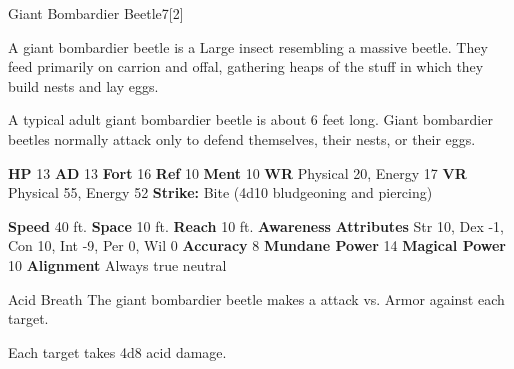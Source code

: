  
  \begin{monsection}{Giant Bombardier Beetle}{7}[2]
    \vspace{-1em}\vspace{-1em}
    \vspace{0em}

    
        A giant bombardier beetle is a Large insect resembling a massive beetle.
        They feed primarily on carrion and offal, gathering heaps of the stuff in which they build nests and lay eggs.
      
        A typical adult giant bombardier beetle is about 6 feet long.
        Giant bombardier beetles normally attack only to defend themselves, their nests, or their eggs.
      

    \begin{spellcontent}
      \begin{spelltargetinginfo}
        \pari \textbf{HP} 13 \monsep
          \textbf{AD} 13 \monsep
          \textbf{Fort} 16 \monsep
          \textbf{Ref} 10 \monsep
          \textbf{Ment} 10
        \pari \textbf{WR} Physical 20, Energy 17 \monsep
        \textbf{VR} Physical 55, Energy 52
        \pari \textbf{Strike:}
            Bite  (4d10 bludgeoning and piercing)
      \end{spelltargetinginfo}
    \end{spellcontent}
    \begin{monsterfooter}
      \pari \textbf{Speed} 40 ft. \monsep
        \textbf{Space} 10 ft. \monsep
        \textbf{Reach} 10 ft.
      \pari \textbf{Awareness} 
      \pari \textbf{Attributes}
        Str 10, Dex -1,
        Con 10, Int -9,
        Per 0, Wil 0
      \pari \textbf{Accuracy} 8 \monsep
        \textbf{Mundane Power} 14 \monsep
      \textbf{Magical Power} 10
      \pari \textbf{Alignment} Always true neutral
    \end{monsterfooter}
  \end{monsection}
  \begin{freeability}{Acid Breath}
       The giant bombardier beetle makes a  attack
        vs. Armor against each target.
    
    \hit Each target takes 4d8 acid damage.
    \end{freeability}
  
